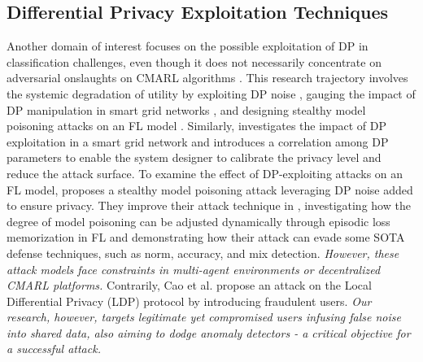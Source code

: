 \subsection{Differential Privacy Exploitation Techniques} Another domain of interest focuses on the possible exploitation of DP in classification challenges, even though it does not necessarily concentrate on adversarial onslaughts on CMARL algorithms \cite{giraldo2017security_2, giraldo2020adversarial, hossain2021privacy,cao2021data,cheu2021manipulation,hossain2022adversarial, Hossain2021Desmp}. This research trajectory involves the systemic degradation of utility by exploiting DP noise \cite{giraldo2020adversarial}, gauging the impact of DP manipulation in smart grid networks \cite{hossain2021privacy}, and designing stealthy model poisoning attacks on an FL model \cite{Hossain2021Desmp, hossain2022adversarial}. Similarly, \cite{hossain2021privacy} investigates the impact of DP exploitation in a smart grid network and introduces a correlation among DP parameters to enable the system designer to calibrate the privacy level and reduce the attack surface. To examine the effect of DP-exploiting attacks on an FL model, \cite{Hossain2021Desmp} proposes a stealthy model poisoning attack leveraging DP noise added to ensure privacy. They improve their attack technique in \cite{hossain2022adversarial}, investigating how the degree of model poisoning can be adjusted dynamically through episodic loss memorization in FL and demonstrating how their attack can evade some SOTA defense techniques, such as norm, accuracy, and mix detection. \textit{However, these attack models face constraints in multi-agent environments or decentralized CMARL platforms.} Contrarily, Cao et al. \cite{cao2021data} propose an attack on the Local Differential Privacy (LDP) protocol by introducing fraudulent users. \textit{Our research, however, targets legitimate yet compromised users infusing false noise into shared data, also aiming to dodge anomaly detectors - a critical objective for a successful attack.}